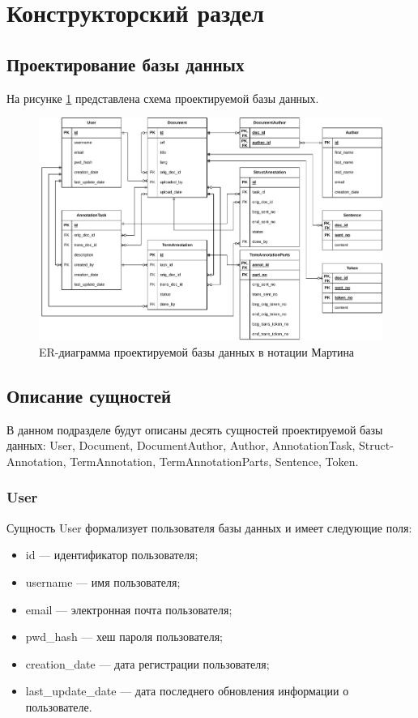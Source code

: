 \section{Конструкторский раздел}

\subsection{Проектирование базы данных}

На рисунке \ref{fig:erd} представлена схема проектируемой базы данных.

\begin{figure}[H]
	\centering
	\includegraphics[width=\textwidth]{diag/erd-v2.pdf}
	\caption{ER-диаграмма проектируемой базы данных в нотации Мартина}
	\label{fig:erd}
\end{figure}

\subsection{Описание сущностей}

В данном подразделе будут описаны десять сущностей проектируемой базы данных: User, Document, DocumentAuthor, Author, AnnotationTask, Struct-Annotation, TermAnnotation, TermAnnotationParts, Sentence, Token.

\subsubsection*{User}

Сущность User формализует пользователя базы данных и имеет следующие поля:
\begin{itemize}
    \item id --- идентификатор пользователя;
    \item username --- имя пользователя;
    \item email --- электронная почта пользователя;
    \item pwd\_hash --- хеш пароля пользователя;
    \item creation\_date --- дата регистрации пользователя;
    \item last\_update\_date --- дата последнего обновления информации о пользователе.
\end{itemize}

